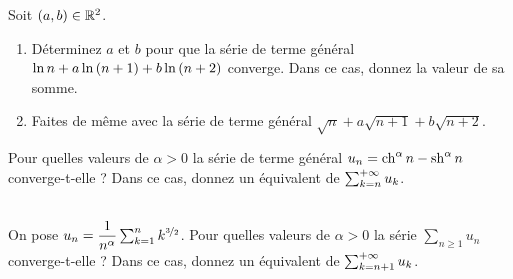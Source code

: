 \begin{corr}
\end{corr}

\begin{exoss}[Exercice 4]
Soit \(\left(a,b\right)\in\mathbb{R}^2\).

\begin{enumerate}
    \item Déterminez \(a\) et \(b\) pour que la série de terme général \(\ln n+a\ln\left(n+1\right)+b\ln\left(n+2\right)\) converge. Dans ce cas, donnez la valeur de sa somme. \\
    \item Faites de même avec la série de terme général \(\sqrt{n}+a\sqrt{n+1}+b\sqrt{n+2}\).
\end{enumerate}
\end{exoss}

\begin{corr}
\end{corr}

\begin{exoss}[Exercice 5]
Pour quelles valeurs de \(\alpha>0\) la série de terme général \(u_n=\operatorname{ch}^\alpha n-\operatorname{sh}^\alpha n\) converge-t-elle ? Dans ce cas, donnez un équivalent de \(\sum_{k=n}^{+\infty}u_k\).
\end{exoss}

\begin{corr}
\end{corr}

\begin{exoss}[Exercice 6]~\\
On pose \(u_n=\dfrac{1}{n^\alpha}\sum_{k=1}^nk^{\nicefrac{3}{2}}\). Pour quelles valeurs de \(\alpha>0\) la série \(\sum_{n\geq1}u_n\) converge-t-elle ? Dans ce cas, donnez un équivalent de \(\sum_{k=n+1}^{+\infty}u_k\).
\end{exoss}

\begin{corr}
\end{corr}

